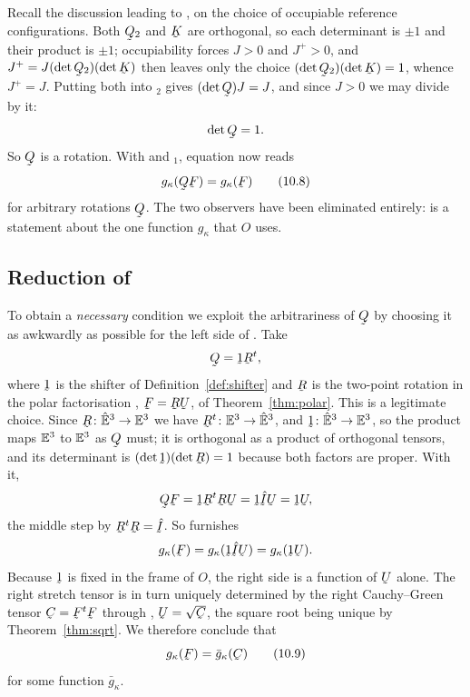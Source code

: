Recall the discussion leading to , on the choice of occupiable
reference configurations. Both $\bQ_{2}$ and $\bK$ are orthogonal, so
each determinant is $\pm1$ and their product is $\pm1$; occupiability
forces $J>0$ and $J^{+}>0$, and $J^{+}=J(\det\bQ_{2})(\det\bK)$ then
leaves only the choice $(\det\bQ_{2})(\det\bK)=1$, whence $J^{+}=J$.
Putting both into $_{2}$ gives $(\det\bQ)J=J$, and since $J>0$
we may divide by it:
\[
   \det\bQ=1 .
\]
So $\bQ$ is a rotation. With  and $_{1}$, equation
 now reads
\begin{equation}
   g_{\kappa}(\bQ\bF)=g_{\kappa}(\bF)
   \tag{10.8}\label{eq:10.8}
\end{equation}
for arbitrary rotations $\bQ$. The two observers have been eliminated
entirely:  is a statement about the one function $g_{\kappa}$
that $O$ uses.

\subsection*{Reduction of }

To obtain a \emph{necessary} condition we exploit the arbitrariness of
$\bQ$ by choosing it as awkwardly as possible for the left side of
. Take
\[
   \bQ=\shift\bR^{t},
\]
where $\shift$ is the shifter of Definition~\ref{def:shifter} and $\bR$
is the two-point rotation in the polar factorisation ,
$\bF=\bR\bU$, of Theorem~\ref{thm:polar}. This is a legitimate choice.
Since $\bR\colon\hVt\to\Vt$ we have $\bR^{t}\colon\Vt\to\hVt$, and
$\shift\colon\hVt\to\Vt$, so the product maps $\mathbb{E}^{3}$ to $\mathbb{E}^{3}$ as $\bQ$
must; it is orthogonal as a product of orthogonal tensors, and its
determinant is $(\det\shift)(\det\bR)=1$ because both factors are proper.
With it,
\[
   \bQ\bF=\shift\bR^{t}\bR\bU=\shift\hI\bU=\shift\bU ,
\]
the middle step by $\bR^{t}\bR=\hI$. So  furnishes
\[
   g_{\kappa}(\bF)=g_{\kappa}(\shift\hI\bU)=g_{\kappa}(\shift\bU).
\]
Because $\shift$ is fixed in the frame of $O$, the right side is a
function of $\bU$ alone. The right stretch tensor is in turn uniquely
determined by the right Cauchy--Green tensor $\bC=\bF^{t}\bF$ through
, $\bU=\sqrt{\bC}$, the square root being unique by
Theorem~\ref{thm:sqrt}. We therefore conclude that
\begin{equation}
   g_{\kappa}(\bF)=\bar g_{\kappa}(\bC)
   \tag{10.9}\label{eq:10.9}
\end{equation}
for some function $\bar g_{\kappa}$.

